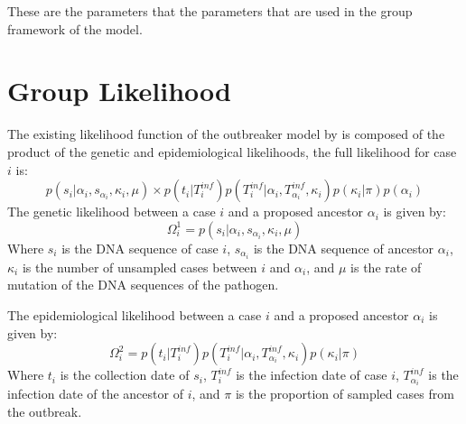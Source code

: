 \documentclass[11pt,a4paper]{report}
\begin{document}
These are the parameters that the parameters that are used in the group framework of the model.

\section{Group Likelihood}
The existing likelihood function of the outbreaker model by \citet{outbrkr} is composed of the product of the genetic and epidemiological likelihoods, the full likelihood for case $i$ is:
\begin{equation}
p(s_i | \alpha_i , s_{\alpha_i}, \kappa_i, \mu) \times p(t_i | T^{inf}_i)p(T^{inf}_i | \alpha_i, T^{inf}_{\alpha_i}, \kappa_i)p(\kappa_i | \pi)p(\alpha_i)
\end{equation}
The genetic likelihood between a case $i$ and a proposed ancestor $\alpha_i$ is given by:
\begin{equation}
\Omega^{1}_i = p(s_i | \alpha_i , s_{\alpha_i}, \kappa_i, \mu)
\end{equation}
Where $s_i$ is the DNA sequence of case $i$, $s_{\alpha_i}$ is the DNA sequence of ancestor $\alpha_i$, $\kappa_i$ is the number of unsampled cases between $i$ and $\alpha_i$, and $\mu$ is the rate of mutation of the DNA sequences of the pathogen.

The epidemiological likelihood between a case $i$ and a proposed ancestor $\alpha_i$ is given by:
\begin{equation}
\Omega^{2}_i = p(t_i | T^{inf}_i)p(T^{inf}_i | \alpha_i, T^{inf}_{\alpha_i}, \kappa_i)p(\kappa_i | \pi)
\end{equation}
Where $t_i$ is the collection date of $s_i$, $T^{inf}_i$ is the infection date of case $i$, $T^{inf}_{\alpha_i}$ is the infection date of the ancestor of $i$, and $\pi$ is the proportion of sampled cases from the outbreak.
\end{document}

